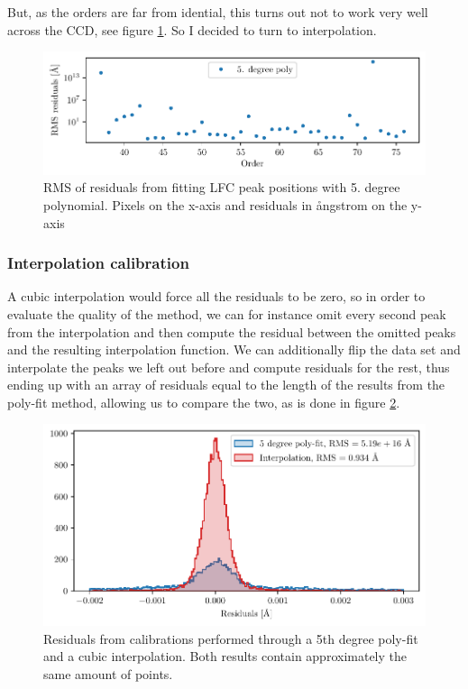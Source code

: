     But, as the orders are far from idential, this turns out not to work very well across the CCD, see figure \ref{fig:LFC_calib_5th_res}. So I decided to turn to interpolation.

    \begin{figure}%
        \begin{wide}  
            \includegraphics[width=\textwidth]{figures/calib/calib_poly_5th_res.pdf}
            \caption{RMS of residuals from fitting LFC peak positions with 5. degree polynomial. Pixels on the x-axis and residuals in ångstrom on the y-axis}
            \label{fig:LFC_calib_5th_res}
        \end{wide}
    \end{figure}


    \subsubsection{Interpolation calibration}
    A cubic interpolation would force all the residuals to be zero, so in order to evaluate the quality of the method, we can for instance omit every second peak from the interpolation and then compute the residual between the omitted peaks and the resulting interpolation function. We can additionally flip the data set and interpolate the peaks we left out before and compute residuals for the rest, thus ending up with an array of residuals equal to the length of the results from the poly-fit method, allowing us to compare the two, as is done in figure \ref{fig:calib_poly_vs_interp}.

    \begin{figure}%
        \begin{wide}  
            \includegraphics[width=\textwidth]{figures/hist_peak_residuals_poly_and_interp.pdf}
            \caption{Residuals from calibrations performed through a 5th degree poly-fit and a cubic interpolation. Both results contain approximately the same amount of points.}
            \label{fig:calib_poly_vs_interp}
        \end{wide}
    \end{figure}

